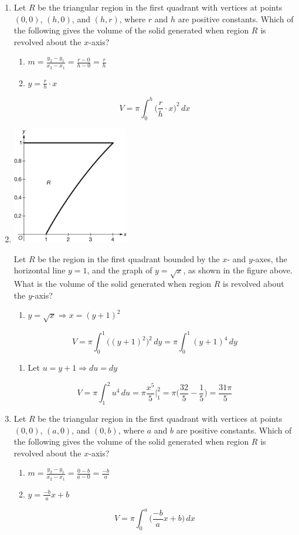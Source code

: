 \documentclass[12pt]{article}
\begin{document}
\begin{enumerate}
    \item Let $R$ be the triangular region in the first quadrant with vertices at points $(0,0)$, $(h,0)$, and $(h,r)$, where $r$ and $h$ are positive constants. Which of the following gives the volume of the solid generated when region $R$ is revolved about the $x$-axis?
    \begin{enumerate}
        \item $m=\frac{y_2-y_1}{x_2-x_1} = \frac{r-0}{h-0}=\frac{r}{h}$
        \item $y=\frac{r}{h}\cdot x$
    \end{enumerate}
    $$\boxed{V=\pi\int_{0}^{h} \biggr(\frac{r}{h}\cdot x\biggr)^2 \, dx}$$
    \item 
    \begin{center}
        \includegraphics[width=2in]{4.032.png}
    \end{center}
    Let $R$ be the region in the first quadrant bounded by the $x$- and $y$-axes, the horizontal line $y=1$, and the graph of $y=\sqrt{x}$, as shown in the figure above. What is the volume of the solid generated when region $R$ is revolved about the $y$-axis?
    \begin{enumerate}
        \item $y=\sqrt{x} \Longrightarrow x=(y+1)^2$
    \end{enumerate}
    $$V=\pi\int_{0}^{1} \biggr((y+1)^2\biggr)^2 \, dy =\pi\int_{0}^{1} (y+1)^4 \, dy $$
    \begin{enumerate}
        \item Let $u=y+1 \Longrightarrow du=dy$
    \end{enumerate}
    $$V=\pi\int_{1}^{2} u^4 \, du = \pi \frac{x^5}{5} \biggr\rvert_{1}^{2} = \pi \biggr(\frac{32}{5}-\frac{1}{5}\biggr) = \boxed{\frac{31\pi}{5}}$$

    \item Let $R$ be the triangular region in the first quadrant with vertices at points $(0,0)$, $(a,0)$, and $(0,b)$, where $a$ and $b$ are positive constants. Which of the following gives the volume of the solid generated when region $R$ is revolved about the $x$-axis?
    \begin{enumerate}
        \item $m=\frac{y_2-y_1}{x_2-x_1} = \frac{0-b}{a-0}=\frac{-b}{a}$
        \item $y=\frac{-b}{a}x+b$
    \end{enumerate}
    $$\boxed{V=\pi\int_{0}^{a}\biggr(\frac{-b}{a}x+b\biggr) \, dx}$$


\end{enumerate}
\end{document}
